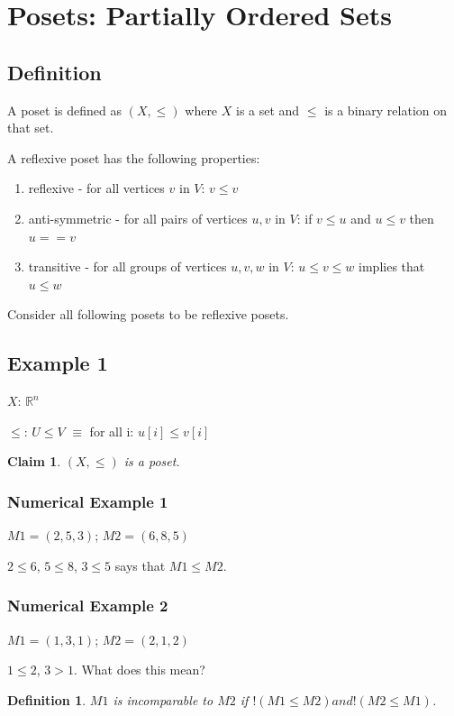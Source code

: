 \documentclass[twoside]{article}
\newtheorem{claim}[theorem]{Claim}
\newtheorem{definition}[theorem]{Definition}
\begin{document}
\section{Posets: Partially Ordered Sets}

\subsection{Definition}
A poset is defined as $(X, \leq)$ where $X$ is a set and $\leq$ is a binary relation on that set.

A reflexive poset has the following properties:
\begin{enumerate}
    \item reflexive - for all vertices $v$ in $V$: $v \leq v$
    \item anti-symmetric - for all pairs of vertices $u,v$ in $V$: if $v \leq u$ and $u \leq v$ then $u == v$
    \item transitive - for all groups of vertices $u,v,w$ in $V$: $u \leq v \leq w$ implies that $u \leq w$
\end{enumerate}

Consider all following posets to be reflexive posets.

\subsection{Example 1}
$X$: $\mathbb{R}^n$

$\leq$: $U \leq V$ $\equiv$ for all i: $u[i] \leq v[i]$

\begin{claim}
$(X, \leq)$ is a poset.
\end{claim}

\subsubsection{Numerical Example 1}
$M1 = (2,5,3)$; $M2 = (6,8,5)$

$2 \leq 6$, $5 \leq 8$, $3 \leq 5$ says that $M1 \leq M2$.

\subsubsection{Numerical Example 2}
$M1 = (1,3,1)$; $M2 = (2,1,2)$

$1 \leq 2$, $3 > 1$. What does this mean?

\begin{definition}
$M1$ is incomparable to $M2$ if $!(M1 \leq M2) and !(M2 \leq M1)$.
\end{definition}
\end{document}
